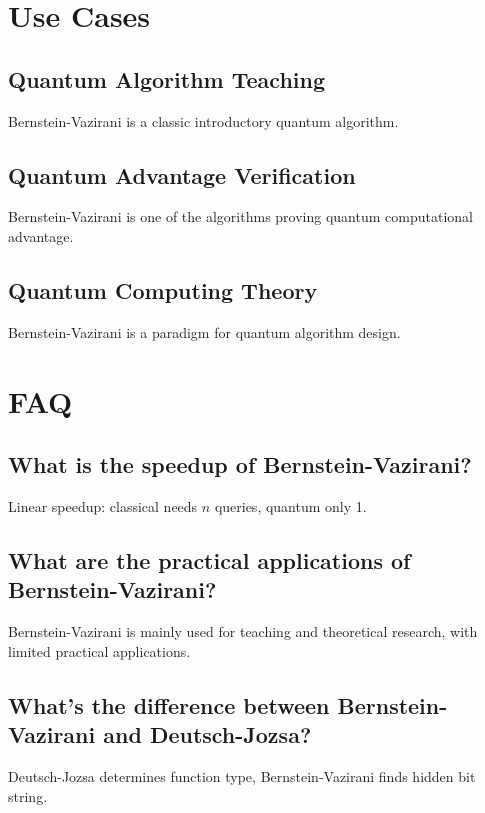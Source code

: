 \documentclass[12pt,a4paper]{article}
\begin{document}
\section{Use Cases}

\subsection{Quantum Algorithm Teaching}

Bernstein-Vazirani is a classic introductory quantum algorithm.

\subsection{Quantum Advantage Verification}

Bernstein-Vazirani is one of the algorithms proving quantum computational advantage.

\subsection{Quantum Computing Theory}

Bernstein-Vazirani is a paradigm for quantum algorithm design.

\section{FAQ}

\subsection{What is the speedup of Bernstein-Vazirani?}

Linear speedup: classical needs $n$ queries, quantum only 1.

\subsection{What are the practical applications of Bernstein-Vazirani?}

Bernstein-Vazirani is mainly used for teaching and theoretical research, with limited practical applications.

\subsection{What's the difference between Bernstein-Vazirani and Deutsch-Jozsa?}

Deutsch-Jozsa determines function type, Bernstein-Vazirani finds hidden bit string.
\end{document}
